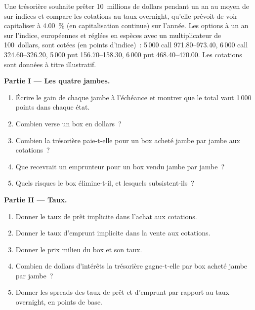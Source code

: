\begin{problem}\label{pb:dv:no-arbitrage-and-the-fundamental-theorems:1}
Une trésorière souhaite prêter 10~millions de dollars pendant un an au moyen de
 sur indices et compare les cotations au taux overnight, qu'elle
prévoit de voir capitaliser à 4.00~\% (en capitalisation continue) sur l'année. Les options à un an sur
l'indice, européennes et réglées en espèces avec un multiplicateur de 100~dollars, sont cotées (en
points d'indice)~: 5\,000 call 971.80--973.40, 6\,000 call 324.60--326.20, 5\,000 put
156.70--158.30, 6\,000 put 468.40--470.00. Les cotations sont données à titre illustratif.

\medskip\noindent\textbf{Partie I --- Les quatre jambes.}
\begin{enumerate}
\item Écrire le gain de chaque jambe à l'échéance et montrer que le total vaut 1\,000
points dans chaque état.
\item Combien verse un box en dollars~?
\item Combien la trésorière paie-t-elle pour un box acheté jambe par jambe aux cotations~?
\item Que recevrait un emprunteur pour un box vendu jambe par jambe~?
\item Quels risques le box élimine-t-il, et lesquels subsistent-ils~?
\end{enumerate}

\medskip\noindent\textbf{Partie II --- Taux.}
\begin{enumerate}[resume]
\item Donner le taux de prêt implicite dans l'achat aux cotations.
\item Donner le taux d'emprunt implicite dans la vente aux cotations.
\item Donner le prix milieu du box et son taux.
\item Combien de dollars d'intérêts la trésorière gagne-t-elle par box acheté jambe par jambe~?
\item Donner les spreads des taux de prêt et d'emprunt par rapport au taux overnight, en points de base.
\end{enumerate}


\end{problem}
